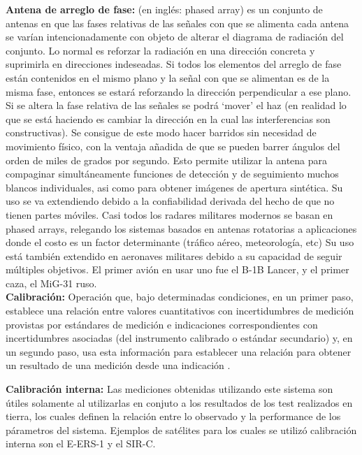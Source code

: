 {\textbf{Antena de arreglo de fase:}}  (en inglés: phased array) es un conjunto de antenas en que las fases relativas de las 
señales con que se alimenta cada antena se varían intencionadamente con objeto de alterar el diagrama de radiación del 
conjunto. Lo normal es reforzar la radiación en una dirección concreta y suprimirla en direcciones indeseadas. Si todos los 
elementos del arreglo de fase están contenidos en el mismo plano y la señal con que se alimentan es de la misma fase, 
entonces se estará reforzando la dirección perpendicular a ese plano. Si se altera la fase relativa de las señales se podrá
\enquote*{mover} el haz (en realidad lo que se está haciendo es cambiar la dirección en la cual las interferencias son 
constructivas). Se consigue de este modo hacer barridos sin necesidad de movimiento físico, con la ventaja añadida de que 
se pueden barrer ángulos del orden de miles de grados por segundo. Esto permite utilizar la antena para compaginar 
simultáneamente funciones de detección y de seguimiento muchos blancos individuales, asi como para obtener imágenes de 
apertura sintética. Su uso se va extendiendo debido a la confiabilidad derivada del hecho de que no tienen partes móviles. 
Casi todos los radares militares modernos se basan en phased arrays, relegando los sistemas basados en antenas rotatorias a 
aplicaciones donde el costo es un factor determinante (tráfico aéreo, meteorología, etc) Su uso está también extendido en
aeronaves militares debido a su capacidad de seguir múltiples objetivos. El primer avión en usar uno fue el B-1B Lancer, y 
el primer caza, el MiG-31 ruso.\\

{\textbf{Calibración:}} Operación que, bajo determinadas condiciones, en un primer paso, establece una relación entre 
valores cuantitativos con incertidumbres de medición provistas por estándares de medición e indicaciones correspondientes
con incertidumbres asociadas (del instrumento calibrado o estándar secundario) y, en un segundo paso, usa
esta información para establecer una relación para obtener un resultado de una medición desde una indicación \cite{CalDef}.

{\textbf{Calibración interna:}} Las mediciones obtenidas utilizando este sistema son útiles solamente al utilizarlas en 
conjuto a los resultados de los test realizados en tierra, los cuales definen la relación entre lo observado y la 
performance de los párametros del sistema. Ejemplos de satélites para los cuales se utilizó calibración interna son el 
E-ERS-1 y el SIR-C.

